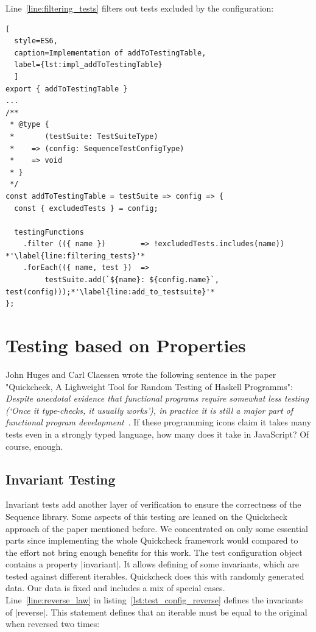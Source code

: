 Line~\ref{line:filtering_tests} filters out tests excluded by the
configuration:
\begin{lstlisting}[
  style=ES6, 
  caption=Implementation of addToTestingTable,
  label={lst:impl_addToTestingTable}
  ]
export { addToTestingTable }
...
/**
 * @type {
 *       (testSuite: TestSuiteType)
 *    => (config: SequenceTestConfigType)
 *    => void
 * }
 */
const addToTestingTable = testSuite => config => {
  const { excludedTests } = config;

  testingFunctions
    .filter (({ name })        => !excludedTests.includes(name)) *'\label{line:filtering_tests}'*
    .forEach(({ name, test })  => 
         testSuite.add(`${name}: ${config.name}`, test(config)));*'\label{line:add_to_testsuite}'*
};
\end{lstlisting}


\section{Testing based on Properties}
\label{sec:Testing based on Properties}
John Huges and Carl Claessen wrote the following sentence in the paper
"Quickcheck, A Lighweight Tool for Random Testing of Haskell Programms":
\textit{
Despite anecdotal evidence that functional programs require somewhat less
testing (`Once it type-checks, it usually works'), in practice it is still a 
major part of functional program development}~\cite{quickcheck_hughes}.
If these programming icons claim it takes many tests even in a strongly typed 
language, how many does it take in JavaScript? Of course, enough.

\subsection{Invariant Testing}
\label{sub:Invariant Testing}
Invariant tests add another layer of verification to ensure the correctness of
the Sequence library. Some aspects of this testing are leaned on the Quickcheck
approach of the paper mentioned before. We concentrated on only some essential
parts since implementing the whole Quickcheck framework would compared to the
effort not bring enough benefits for this work.
\newline
The test configuration object contains a property |invariant|. It allows
defining of some invariants, which are tested against different iterables.
Quickcheck does this with randomly generated data. Our data is fixed and
includes a mix of special cases.
\newline
Line~\ref{line:reverse_law} in listing~\ref{lst:test_config_reverse} defines
the invariants of |reverse|. This statement defines that an iterable must be 
equal to the original when reversed two times:

